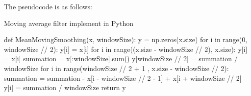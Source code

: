 \documentclass[conference]{IEEEtran}
\begin{document}
The pseudocode is as follows:
\begin{algorithm}
\centering
	\caption{Moving average filter implement in Python}
	\begin{algorithmic}
	\STATE def MeanMovingSmoothing(x, windowSize):
    \STATE \qquad y = np.zeros(x.size)
    \STATE \qquad for i in range(0, windowSize // 2):
    \STATE \qquad \qquad y[i] = x[i]
    \STATE \qquad for i in range((x.size - windowSize // 2), x.size):
    \STATE \qquad \qquad y[i] = x[i]
    \STATE \qquad summation = x[:windowSize].sum()
    \STATE \qquad y[windowSize // 2] = summation / windowSize
    \STATE \qquad for i in range(windowSize // 2 + 1
    \STATE \qquad \qquad \qquad \qquad , x.size - windowSize // 2):
    \STATE \qquad \qquad summation = summation - 
    \STATE \qquad \qquad \qquad \qquad x[i - windowSize // 2 - 1] 
    \STATE \qquad \qquad \qquad \qquad + x[i + windowSize // 2]
    \STATE \qquad \qquad y[i] = summation / windowSize
    \STATE \qquad return y
	\end{algorithmic}
\end{algorithm}
\end{document}
